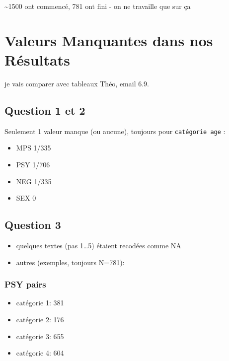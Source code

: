 \documentclass[
]{article}
\providecommand{\tightlist}{%
  \setlength{\itemsep}{0pt}\setlength{\parskip}{0pt}}
\begin{document}
\textasciitilde1500 ont commencé, 781 ont fini - on ne travaille que sur
ça

\hypertarget{valeurs-manquantes-dans-nos-ruxe9sultats}{%
\section{Valeurs Manquantes dans nos
Résultats}\label{valeurs-manquantes-dans-nos-ruxe9sultats}}

je vais comparer avec tableaux Théo, email 6.9.

\hypertarget{question-1-et-2}{%
\subsection{Question 1 et 2}\label{question-1-et-2}}

Seulement 1 valeur manque (ou aucune), toujours pour
\texttt{catégorie\ age} :

\begin{itemize}
\tightlist
\item
  MPS 1/335
\item
  PSY 1/706
\item
  NEG 1/335
\item
  SEX 0
\end{itemize}

\hypertarget{question-3}{%
\subsection{Question 3}\label{question-3}}

\begin{itemize}
\tightlist
\item
  quelques textes (pas 1\ldots5) étaient recodées comme NA
\item
  autres (exemples, toujours N=781):
\end{itemize}

\hypertarget{psy-pairs}{%
\subsubsection{PSY pairs}\label{psy-pairs}}

\begin{itemize}
\tightlist
\item
  catégorie 1: 381
\item
  catégorie 2: 176
\item
  catégorie 3: 655
\item
  catégorie 4: 604
\end{itemize}
\end{document}
